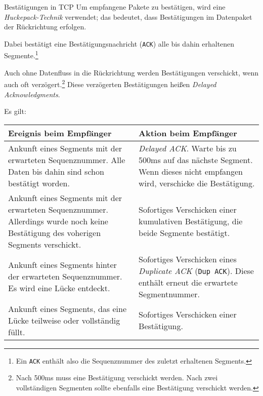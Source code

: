 \begin{defi}{Bestätigungen in TCP}
    Um empfangene Pakete zu bestätigen, wird eine \emph{Huckepack-Technik} verwendet; das bedeutet, dass Bestätigungen im Datenpaket der Rückrichtung erfolgen.

    Dabei bestätigt eine Bestätigungsnachricht (\texttt{ACK}) alle bis dahin erhaltenen Segmente.\footnote{Ein \texttt{ACK} enthält also die Sequenznummer des zuletzt erhaltenen Segments.}

    Auch ohne Datenfluss in die Rückrichtung werden Bestätigungen verschickt, wenn auch oft verzögert.\footnote{Nach 500ms muss eine Bestätigung verschickt werden. Nach zwei vollständigen Segmenten sollte ebenfalls eine Bestätigung verschickt werden.}
    Diese verzögerten Bestätigungen heißen \emph{Delayed Acknowledgments}.

    Es gilt:

    \begin{tabularx}{\textwidth}{|X|X|}
        \hline
        Ereignis beim Empfänger                                                                                                             & Aktion beim Empfänger                                                                                                         \\
        \hline
        \hline
        Ankunft eines Segments mit der erwarteten Sequenznummer. Alle Daten bis dahin sind schon bestätigt worden.                          & \emph{Delayed ACK}. Warte bis zu 500ms auf das nächste Segment. Wenn dieses nicht empfangen wird, verschicke die Bestätigung. \\
        \hline
        Ankunft eines Segments mit der erwarteten Sequenznummer. Allerdings wurde noch keine Bestätigung des voherigen Segments verschickt. & Sofortiges Verschicken einer kumulativen Bestätigung, die beide Segmente bestätigt.                                           \\
        \hline
        Ankunft eines Segments hinter der erwarteten Sequenznummer. Es wird eine Lücke entdeckt.                                            & Sofortiges Verschicken eines \emph{Duplicate ACK} (\texttt{Dup ACK}). Diese enthält erneut die erwartete Segmentnummer.       \\
        \hline
        Ankunft eines Segments, das eine Lücke teilweise oder vollständig füllt.                                                            & Sofortiges Verschicken einer Bestätigung.                                                                                     \\
        \hline
    \end{tabularx}
\end{defi}


